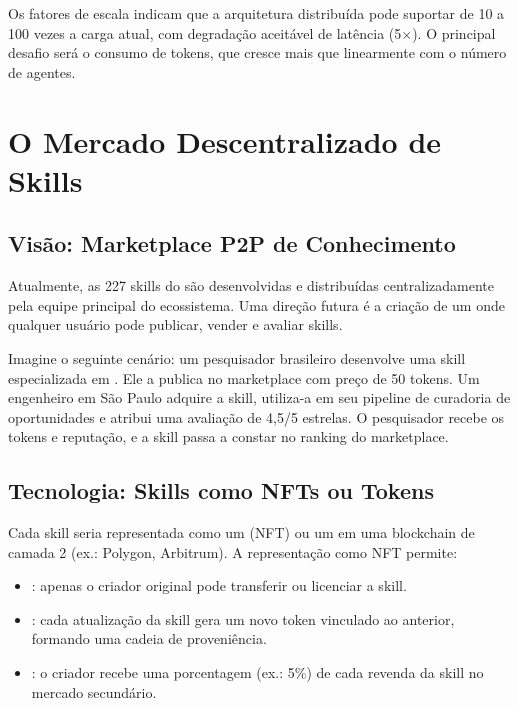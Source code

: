 \noindent Os fatores de escala indicam que a arquitetura distribuída
pode suportar de 10 a 100 vezes a carga atual, com degradação
aceitável de latência (5$\times$). O principal desafio será o consumo
de tokens, que cresce mais que linearmente com o número de agentes.

\section{O Mercado Descentralizado de Skills}
\label{sec:mercado-skills}
\nivelintermediario

\subsection{Visão: Marketplace P2P de Conhecimento}

Atualmente, as 227 skills do \opencodeeco{} são desenvolvidas e
distribuídas centralizadamente pela equipe principal do ecossistema.
Uma direção futura é a criação de um  onde qualquer usuário pode publicar, vender e avaliar
skills.

Imagine o seguinte cenário: um pesquisador brasileiro desenvolve uma
skill especializada em . Ele a publica no marketplace com preço
de 50 tokens. Um engenheiro em São Paulo adquire a skill, utiliza-a
em seu pipeline de curadoria de oportunidades e atribui uma
avaliação de 4,5/5 estrelas. O pesquisador recebe os tokens e
reputação, e a skill passa a constar no ranking do marketplace.

\subsection{Tecnologia: Skills como NFTs ou Tokens}

Cada skill seria representada como um 
(NFT) ou um  em uma blockchain de camada 2
(ex.: Polygon, Arbitrum). A representação como NFT permite:

\begin{itemize}
    \item {}: apenas o criador
    original pode transferir ou licenciar a skill.
    \item {}: cada atualização da skill
    gera um novo token vinculado ao anterior, formando uma cadeia
    de proveniência.
    \item {}: o criador recebe uma porcentagem
    (ex.: 5\%) de cada revenda da skill no mercado secundário.
\end{itemize}

